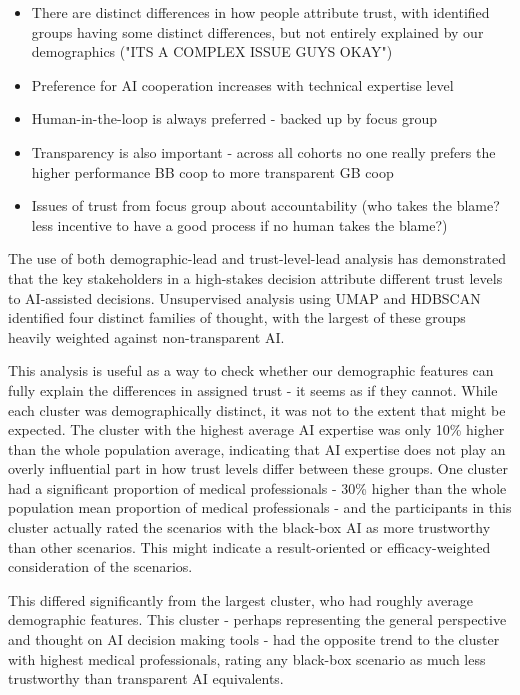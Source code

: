 \documentclass[manuscript,screen,review]{acmart}
\begin{document}
\begin{itemize}
    \item There are distinct differences in how people attribute trust, with identified groups having some distinct differences, but not entirely explained by our demographics ("ITS A COMPLEX ISSUE GUYS OKAY")
    \item Preference for AI cooperation increases with technical expertise level
    \item Human-in-the-loop is always preferred - backed up by focus group
    \item Transparency is also important - across all cohorts no one really prefers the higher performance BB coop to more transparent GB coop
    \item Issues of trust from focus group about accountability (who takes the blame? less incentive to have a good process if no human takes the blame?)
\end{itemize}



The use of both demographic-lead and trust-level-lead analysis has demonstrated that the key stakeholders in a high-stakes decision attribute different trust levels to AI-assisted decisions. Unsupervised analysis using UMAP and HDBSCAN identified four distinct families of thought, with the largest of these groups heavily weighted against non-transparent AI. 

This analysis is useful as a way to check whether our demographic features can fully explain the differences in assigned trust - it seems as if they cannot. While each cluster was demographically distinct, it was not to the extent that might be expected. The cluster with the highest average AI expertise was only 10\% higher than the whole population average, indicating that AI expertise does not play an overly influential part in how trust levels differ between these groups. One cluster had a significant proportion of medical professionals - 30\% higher than the whole population mean proportion of medical professionals - and the participants in this cluster actually rated the scenarios with the black-box AI as more trustworthy than other scenarios. This might indicate a result-oriented or efficacy-weighted consideration of the scenarios.

This differed significantly from the largest cluster, who had roughly average demographic features. This cluster - perhaps representing the general perspective and thought on AI decision making tools - had the opposite trend to the cluster with highest medical professionals, rating any black-box scenario as much less trustworthy than transparent AI equivalents. 
\end{document}
